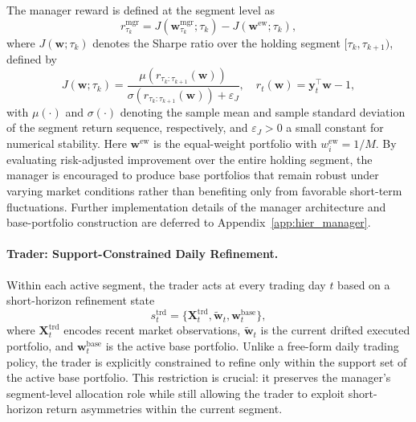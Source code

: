 \documentclass[letterpaper]{article} %
\begin{document}
The manager reward is defined at the segment level as
\[
r^{\mathrm{mgr}}_{\tau_k}
=
J\!\left(\mathbf{w}^{\mathrm{mgr}}_{\tau_k};\tau_k\right)
-
J\!\left(\mathbf{w}^{\mathrm{ew}};\tau_k\right),
\]
where \(J(\mathbf{w};\tau_k)\) denotes the Sharpe ratio over the holding segment \([\tau_k,\tau_{k+1})\), defined by
\[
J(\mathbf{w};\tau_k)
=
\frac{
\mu\!\left(r_{\tau_k:\tau_{k+1}}(\mathbf{w})\right)
}{
\sigma\!\left(r_{\tau_k:\tau_{k+1}}(\mathbf{w})\right)+\varepsilon_J
},
\quad
r_t(\mathbf{w})=\mathbf{y}_t^\top\mathbf{w}-1,
\]
with \(\mu(\cdot)\) and \(\sigma(\cdot)\) denoting the sample mean and sample standard deviation of the segment return sequence, respectively, and \(\varepsilon_J>0\) a small constant for numerical stability. Here \(\mathbf{w}^{\mathrm{ew}}\) is the equal-weight portfolio with \(w_i^{\mathrm{ew}}=1/M\). By evaluating risk-adjusted improvement over the entire holding segment, the manager is encouraged to produce base portfolios that remain robust under varying market conditions rather than benefiting only from favorable short-term fluctuations. Further implementation details of the manager architecture and base-portfolio construction are deferred to Appendix~\ref{app:hier_manager}.

\paragraph{Trader: Support-Constrained Daily Refinement.}
Within each active segment, the trader acts at every trading day \(t\) based on a short-horizon refinement state
\[
s_t^{\mathrm{trd}}
=
\bigl\{\mathbf{X}^{\mathrm{trd}}_t,\tilde{\mathbf{w}}_t,\mathbf{w}^{\mathrm{base}}_t\bigr\},
\]
where \(\mathbf{X}^{\mathrm{trd}}_t\) encodes recent market observations, \(\tilde{\mathbf{w}}_t\) is the current drifted executed portfolio, and \(\mathbf{w}^{\mathrm{base}}_t\) is the active base portfolio. Unlike a free-form daily trading policy, the trader is explicitly constrained to refine only within the support set of the active base portfolio. This restriction is crucial: it preserves the manager’s segment-level allocation role while still allowing the trader to exploit short-horizon return asymmetries within the current segment.
\end{document}
